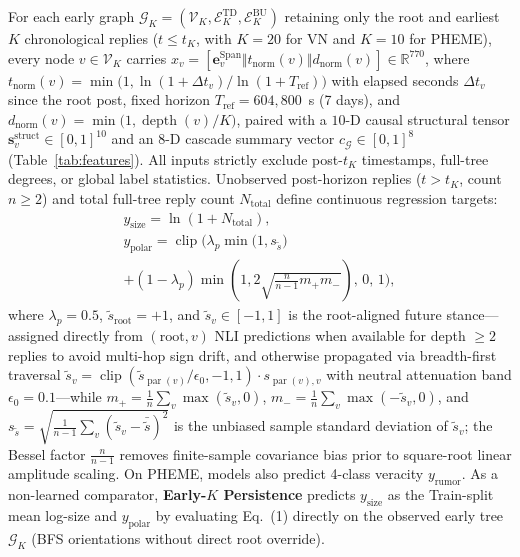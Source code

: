 \documentclass[conference]{IEEEtran}
\begin{document}
For each early graph $\mathcal{G}_K = (\mathcal{V}_K, \mathcal{E}_K^{\text{TD}}, \mathcal{E}_K^{\text{BU}})$ retaining only the root and earliest $K$ chronological replies ($t \le t_K$, with $K=20$ for VN and $K=10$ for PHEME), every node $v \in \mathcal{V}_K$ carries $x_v = [\mathbf{e}_v^{\text{Span}} \Vert t_{\text{norm}}(v) \Vert d_{\text{norm}}(v)] \in \mathbb{R}^{770}$, where $t_{\text{norm}}(v) = \min\!\bigl(1, \ln(1 + \Delta t_v)/\ln(1 + T_{\text{ref}})\bigr)$ with elapsed seconds $\Delta t_v$ since the root post, fixed horizon $T_{\text{ref}} = 604{,}800$~s (7 days), and $d_{\text{norm}}(v) = \min\!\bigl(1, \operatorname{depth}(v)/K\bigr)$, paired with a $10$-D causal structural tensor $\mathbf{s}_v^{\text{struct}} \in [0, 1]^{10}$ and an $8$-D cascade summary vector $c_{\mathcal{G}} \in [0, 1]^8$ (Table~\ref{tab:features}). All inputs strictly exclude post-$t_K$ timestamps, full-tree degrees, or global label statistics. Unobserved post-horizon replies ($t > t_K$, count $n \ge 2$) and total full-tree reply count $N_{\text{total}}$ define continuous regression targets:
\begin{multline}
y_{\text{size}} = \ln(1 + N_{\text{total}}), \\
y_{\text{polar}} = \operatorname{clip}\!\Biggl(\lambda_p \min\!\bigl(1, s_{\tilde{s}}\bigr) \\
+ (1-\lambda_p)\min\!\left(1, 2\sqrt{\frac{n}{n-1} m_+ m_-}\right),\, 0,\, 1\Biggr),
\end{multline}
where $\lambda_p = 0.5$, $\tilde{s}_{\text{root}} = +1$, and $\tilde{s}_v \in [-1, 1]$ is the root-aligned future stance---assigned directly from $(\text{root}, v)$ NLI predictions when available for depth $\ge 2$ replies to avoid multi-hop sign drift, and otherwise propagated via breadth-first traversal $\tilde{s}_v = \operatorname{clip}(\tilde{s}_{\operatorname{par}(v)}/\epsilon_0, -1, 1) \cdot s_{\operatorname{par}(v),v}$ with neutral attenuation band $\epsilon_0 = 0.1$---while $m_+ = \frac{1}{n}\sum_v \max(\tilde{s}_v, 0)$, $m_- = \frac{1}{n}\sum_v \max(-\tilde{s}_v, 0)$, and $s_{\tilde{s}} = \sqrt{\frac{1}{n-1}\sum_v (\tilde{s}_v - \bar{\tilde{s}})^2}$ is the unbiased sample standard deviation of $\tilde{s}_v$; the Bessel factor $\frac{n}{n-1}$ removes finite-sample covariance bias prior to square-root linear amplitude scaling. On PHEME, models also predict 4-class veracity $y_{\text{rumor}}$. As a non-learned comparator, \textbf{Early-$K$ Persistence} predicts $y_{\text{size}}$ as the Train-split mean log-size and $y_{\text{polar}}$ by evaluating Eq.~(1) directly on the observed early tree $\mathcal{G}_K$ (BFS orientations without direct root override).
\end{document}
